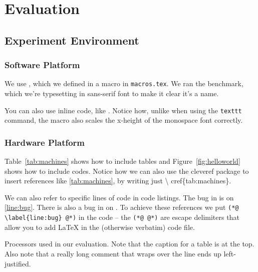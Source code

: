 \chapter{Evaluation}
\label{cha:evaluation}
\section{Experiment Environment}
\subsection{Software Platform}
\label{sec:softplat}

We use \jikesrvm, which we defined in a macro in
\texttt{macros.tex}. We ran the \avrora benchmark, which we're
typesetting in sans-serif font to make it clear it's a name.

You can also use inline code, like . Notice how, unlike when
using the \texttt{texttt} command, the  macro also scales the
x-height of the monospace font correctly.

\subsection{Hardware Platform}
\label{sec:hardplat}

Table~\ref{tab:machines} shows how to include tables and
Figure~\ref{fig:helloworld} shows how to include codes. Notice how we
can also use the \textsf{cleveref} package to insert references like
\cref{tab:machines}, by writing just \textbackslash
cref\{tab:machines\}.

We can also refer to specific lines of code in code listings. The bug
in  is on \cref{line:bug}. There is also a bug in
 on
. To achieve these
references we put \texttt{(*@ \textbackslash label\{line:bug\} @*)} in
the code -- the \texttt{(*@ @*)} are escape delimiters that allow you
to add LaTeX in the (otherwise verbatim) code file.

\begin{table*}
  \centering

  \caption{Processors used in our evaluation.  Note that the caption
    for a table is at the top.  Also note that a really long comment
    that wraps over the line ends up left-justified.}
  
  \label{tab:machines}
  
\end{table*}

